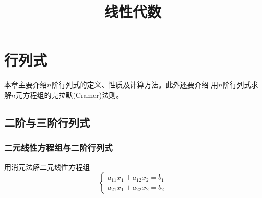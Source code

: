 \documentclass[adobefonts]{ctexbook}
\title{线性代数}
\begin{document}
\maketitle
\tableofcontents

\chapter{行列式}
本章主要介绍$n$阶行列式的定义、性质及计算方法。此外还要介绍
用$n$阶行列式求解$n$元方程组的克拉默(Cramer)法则。
\section{二阶与三阶行列式}
\subsection{二元线性方程组与二阶行列式}
用消元法解二元线性方程组
\begin{equation}
  \label{equ:one}
\begin{cases}
  a_{11}x_1+a_{12}x_2 = b_1\\
  a_{21} x_1+a_{22}x_2 = b_2
\end{cases}
\end{equation}
\end{document}
